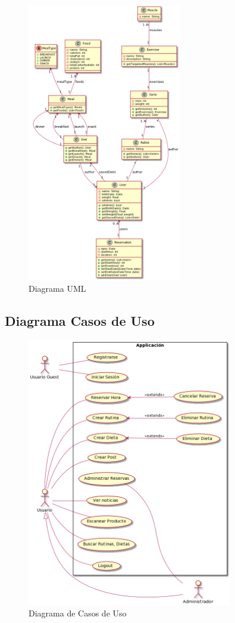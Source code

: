 \documentclass[12pt,a4paper]{article}
\begin{document}
\begin{figure}[h]
 	\centering
	\includegraphics[width=0.6\textwidth]{uml}
	\caption{Diagrama UML}
\end{figure}

\newpage

\subsection{Diagrama Casos de Uso}

\begin{figure}[h]
 	\centering
	\includegraphics[width=0.8\textwidth]{casos_uso}
	\caption{Diagrama de Casos de Uso}
\end{figure}
\end{document}
